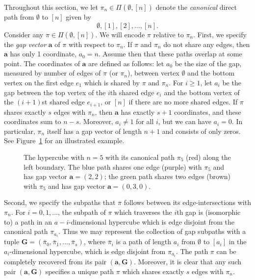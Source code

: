 \documentclass[11pt]{article}
\theoremstyle{definition}
\theoremstyle{remark}
\theoremstyle{remark}
\numberwithin{theorem}{section}
\begin{document}
Throughout this section, we let $\pi_{n} \in \Pi(\emptyset, [n])$ denote the \textit{canonical} direct path from $\emptyset$ to $[n]$ given by
$$
	\emptyset, [1], [2],\dots,[n].
$$
Consider any $\pi \in \Pi(\emptyset, [n]).$ We will encode $\pi$ relative to $\pi_{n}$. First, we specify the \textit{gap vector} $\bm{a}$ of $\pi$ with respect to $\pi_{n}$. If $\pi$ and $\pi_{n}$ do not share any edges, then $\bm{a}$ has only 1 coordinate, $a_0=n$. Assume then that these paths overlap at some point. The coordinates of $\bm{a}$ are defined as follows: let $a_{0}$ be the size of the gap, measured by number of edges of $\pi$ (or $\pi_n$), between vertex $\emptyset$ and the bottom vertex on the first edge $e_{1}$ which is shared by $\pi$ and $\pi_{n}$. For $i \geq 1$, let $a_{i}$ be the gap between the top vertex of the $i$th shared edge $e_{i}$ and the bottom vertex of the $(i+1)$st shared edge $e_{i+1}$, or $[n]$ if there are no more shared edges. If $\pi$ shares exactly $s$ edges with $\pi_{n}$, then $\bm{a}$ has exactly $s+1$ coordinates, and these coordinates sum to $n-s$. Moreover, $a_{i} \neq 1$ for all $i$, but we can have $a_{i} = 0$. In particular, $\pi_n$ itself has a gap vector of length $n+1$ and consists of only zeros. See Figure~\ref{fig:cube_paths} for an illustrated example.

\begin{figure}[h]
    \centering
    
    \caption{The hypercube with $n=5$ with its canonical path $\pi_{5}$ (red) along the left boundary. The blue path shares one edge (purple) with $\pi_{5}$ and has gap vector $\bm{a} = (2,2)$; the green path shares two edges (brown) with $\pi_{5}$ and has gap vector $\bm{a}=(0,3,0)$.}
    \label{fig:cube_paths}
\end{figure}

Second, we specify the subpaths that $\pi$ follows between its edge-intersections with $\pi_{n}$. For $i = 0,1,\dots$, the subpath of $\pi$ which traverses the $i$th gap is (isomorphic to) a path in an $a-i$-dimensional hypercube which is edge disjoint from the canonical path $\pi_{a_{i}}$. Thus we may represent the collection of gap subpaths with a tuple $\bm{G} = (\bar{\pi}_{0}, \bar{\pi}_{1},\dots,\bar{\pi}_{s})$, where $\bar{\pi}_{i}$ is a path of length $a_{i}$ from $\emptyset$ to $[a_{i}]$ in the $a_i$-dimensional hypercube, which is edge disjoint from $\pi_{a_{i}}$. The path $\pi$ can be completely recovered from its pair $(\bm{a},\bm{G})$. Moreover, it is clear that any such pair $(\bm{a},\bm{G})$ specifies a unique path $\pi$ which shares exactly $s$ edges with $\pi_{n}$. 
\end{document}
